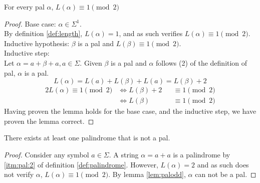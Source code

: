 \begin{lemma}
\label{lem:palodd}
	For every pal $\alpha$, $L(\alpha) \equiv 1 \pmod{2}$
\end{lemma}
\begin{proof}
Base case: $\alpha\in\Sigma^1$.\\
By definition \ref{def:length}, $L(\alpha)=1$, and as such verifies $L(\alpha) \equiv 1 \pmod{2}$.\\
Inductive hypothesis: $\beta$ is a pal and $L(\beta) \equiv 1 \pmod{2}$.\\
Inductive step:\\
Let $\alpha=a+\beta+a, a\in\Sigma$. Given $\beta$ is a pal and $\alpha$ follows (2) of the definition of pal, $\alpha$ is a pal.
\begin{equation*}
	L(\alpha)=L(a)+L(\beta)+L(a)=L(\beta)+2
\end{equation*}
\begin{alignat*}{2}
	L(\alpha) \equiv 1 \pmod{2} &\iff L(\beta)+2 &&\equiv 1 \pmod{2} \\
		                        &\iff L(\beta)   &&\equiv 1 \pmod{2}
\end{alignat*}
Having proven the lemma holds for the base case, and the inductive step, we have proven the lemma correct.
\end{proof}
\begin{theorem}
	There exists at least one palindrome that is not a pal.
\end{theorem}
\begin{proof}
	Consider any symbol $a\in\Sigma$. A string $\alpha=a+a$ is a palindrome by \eqref{itm:pal:2} of definition \ref{def:palindrome}. However, $L(\alpha)=2$ and as such does not verify $\alpha$, $L(\alpha) \equiv 1 \pmod{2}$. By lemma \eqref{lem:palodd}, $\alpha$ can not be a pal.
\end{proof}
\pagebreak
